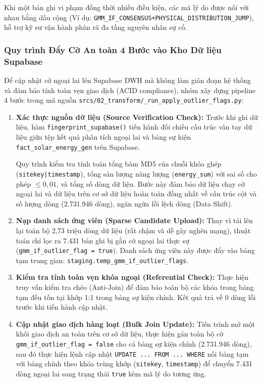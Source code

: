 \documentclass[12pt, a4paper]{report}
\begin{document}
Khi một bản ghi vi phạm đồng thời nhiều điều kiện, các mã lý do được nối với nhau bằng dấu cộng (Ví dụ: \texttt{GMM\_IF\_CONSENSUS\allowbreak +PHYSICAL\_DISTRIBUTION\_JUMP}), hỗ trợ kỹ sư vận hành phân rã đa tầng nguyên nhân sự cố.

\subsubsection{Quy trình Đẩy Cờ An toàn 4 Bước vào Kho Dữ liệu Supabase}
Để cập nhật cờ ngoại lai lên Supabase DWH mà không làm gián đoạn hệ thống và đảm bảo tính toàn vẹn giao dịch (ACID compliance), nhóm xây dựng pipeline 4 bước trong mã nguồn \texttt{srcs/02\_transform/\_run\_apply\_outlier\_flags.py}:
\begin{enumerate}
    \item \textbf{Xác thực nguồn dữ liệu (Source Verification Check):} Trước khi ghi dữ liệu, hàm \texttt{fingerprint\_supabase()} tiến hành đối chiếu cấu trúc vân tay dữ liệu giữa tệp kết quả phân tích ngoại lai và bảng sự kiện \texttt{fact\_solar\_energy\_gen} trên Supabase. 
    
    Quy trình kiểm tra tính toán tổng băm MD5 của chuỗi khóa ghép (\texttt{sitekey|timestamp}), tổng sản lượng năng lượng (\texttt{energy\_sum}) với sai số cho phép $\le 0{,}01$, và tổng số dòng dữ liệu. Bước này đảm bảo dữ liệu chạy cờ ngoại lai và dữ liệu trên cơ sở dữ liệu hoàn toàn đồng nhất về cấu trúc cột và số lượng dòng (2.731.946 dòng), ngăn ngừa lỗi lệch dòng (Data Shift).
    
    \item \textbf{Nạp danh sách ứng viên (Sparse Candidate Upload):} Thay vì tải lên lại toàn bộ 2,73 triệu dòng dữ liệu (rất chậm và dễ gây nghẽn mạng), thuật toán chỉ lọc ra 7.431 bản ghi bị gắn cờ ngoại lai thực sự (\texttt{gmm\_if\_outlier\_flag = true}). Danh sách ứng viên này được đẩy vào bảng tạm trung gian: \texttt{staging.temp\_gmm\_if\_outlier\_flags}.
    
    \item \textbf{Kiểm tra tính toàn vẹn khóa ngoại (Referential Check):} Thực hiện truy vấn kiểm tra chéo (Anti-Join) để đảm bảo toàn bộ các khóa trong bảng tạm đều tồn tại khớp 1:1 trong bảng sự kiện chính. Kết quả trả về 0 dòng lỗi trước khi tiến hành cập nhật.
    
    \item \textbf{Cập nhật giao dịch hàng loạt (Bulk Join Update):} Tiến trình mở một khối giao dịch an toàn trên cơ sở dữ liệu, thực hiện gán toàn bộ cờ \texttt{gmm\_if\_outlier\_flag = false} cho cả bảng sự kiện chính (2.731.946 dòng), sau đó thực hiện lệnh cập nhật \texttt{UPDATE ... FROM ... WHERE} nối bảng tạm với bảng chính theo khóa trùng khớp (\texttt{sitekey}, \texttt{timestamp}) để chuyển 7.431 dòng ngoại lai sang trạng thái \texttt{true} kèm mã lý do tương ứng.
\end{enumerate}
\end{document}
